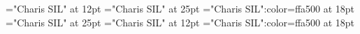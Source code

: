 \documentclass[a4paper]{article}
\begin{document}
\pagestyle{plain}
\sloppy
\setlength{\parfillskip}{0pt plus 1fil}
\font\div="Charis SIL" at 12pt
\font{}="Charis SIL" at 25pt
\font{}="Charis SIL":color=ffa500 at 18pt
\font\entryletHeaddiv="Charis SIL" at 25pt
\font{}="Charis SIL" at 12pt
\font{}="Charis SIL":color=ffa500 at 18pt

\pagestyle{fancy} 


\end{document}
